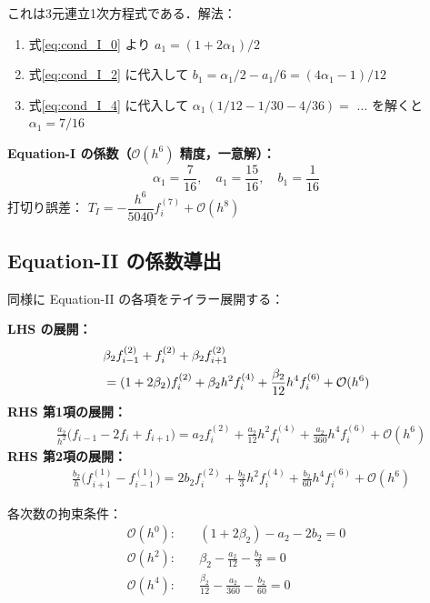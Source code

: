 \documentclass[12pt, a4paper, titlepage]{article}
\newcommand{\jp}[1]{{\normalfont\jpfont #1}}
\newcommand{\Ord}[1]{\mathcal{O}(#1)}
\newcommand{\fp}[1]{f^{(1)}_{#1}}
\newcommand{\fpp}[1]{f^{(2)}_{#1}}
\begin{document}
\jp{これは3元連立1次方程式である．解法：}
\begin{enumerate}[noitemsep]
  \item \jp{式\eqref{eq:cond_I_0} より $a_1 = (1+2\alpha_1)/2$}
  \item \jp{式\eqref{eq:cond_I_2} に代入して $b_1 = \alpha_1/2 - a_1/6 = (4\alpha_1-1)/12$}
  \item \jp{式\eqref{eq:cond_I_4} に代入して
        $\alpha_1(1/12 - 1/30 - 4/36) = $ $\ldots$ を解くと $\alpha_1 = 7/16$}
\end{enumerate}

\begin{tcolorbox}[resultbox]
\textbf{\jp{Equation-I の係数（}$\Ord{h^6}$ \jp{精度，一意解）：}}
\begin{equation}
  \boxed{
    \alpha_1 = \frac{7}{16},\quad
    a_1 = \frac{15}{16},\quad
    b_1 = \frac{1}{16}
  }
  \label{eq:coef_I}
\end{equation}
\jp{打切り誤差：} $T_I = -\dfrac{h^6}{5040}f^{(7)}_i + \Ord{h^8}$
\end{tcolorbox}

\subsection{Equation-II \jp{の係数導出}}

\jp{同様に Equation-II の各項をテイラー展開する：}
\begin{tcolorbox}[derivbox]
\textbf{\jp{LHS の展開：}}
\begin{align}
  &\beta_2\fpp{i-1} + \fpp{i} + \beta_2\fpp{i+1} \notag\\
  &= (1+2\beta_2)\fpp{i} + \beta_2 h^2 f^{(4)}_i
    + \frac{\beta_2}{12}h^4 f^{(6)}_i + \Ord{h^6}
\end{align}
\textbf{\jp{RHS 第1項の展開：}}
\begin{align}
  &\frac{a_2}{h^2}\bigl(f_{i-1}-2f_i+f_{i+1}\bigr) = a_2\fpp{i}
    + \frac{a_2}{12}h^2 f^{(4)}_i
    + \frac{a_2}{360}h^4 f^{(6)}_i + \Ord{h^6}
\end{align}
\textbf{\jp{RHS 第2項の展開：}}
\begin{align}
  &\frac{b_2}{h}\bigl(\fp{i+1}-\fp{i-1}\bigr) = 2b_2\fpp{i}
    + \frac{b_2}{3}h^2 f^{(4)}_i
    + \frac{b_2}{60}h^4 f^{(6)}_i + \Ord{h^6}
\end{align}
\end{tcolorbox}

\jp{各次数の拘束条件：}
\begin{align}
  \Ord{h^0}:&\quad (1+2\beta_2) - a_2 - 2b_2 = 0
  \label{eq:cond_II_0}\\[3pt]
  \Ord{h^2}:&\quad \beta_2 - \frac{a_2}{12} - \frac{b_2}{3} = 0
  \label{eq:cond_II_2}\\[3pt]
  \Ord{h^4}:&\quad \frac{\beta_2}{12} - \frac{a_2}{360} - \frac{b_2}{60} = 0
  \label{eq:cond_II_4}
\end{align}
\end{document}
